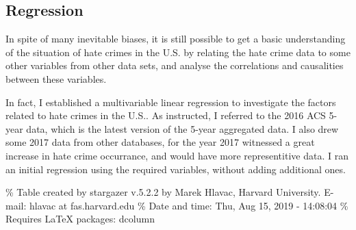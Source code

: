 \documentclass[]{article}
\begin{document}
\hypertarget{regression}{%
\subsection{Regression}\label{regression}}

In spite of many inevitable biases, it is still possible to get a basic
understanding of the situation of hate crimes in the U.S. by relating
the hate crime data to some other variables from other data sets, and
analyse the correlations and causalities between these variables.

In fact, I established a multivariable linear regression to investigate
the factors related to hate crimes in the U.S.. As instructed, I
referred to the 2016 ACS 5-year data, which is the latest version of the
5-year aggregated data. I also drew some 2017 data from other databases,
for the year 2017 witnessed a great increase in hate crime occurrance,
and would have more representitive data. I ran an initial regression
using the required variables, without adding additional ones.

\% Table created by stargazer v.5.2.2 by Marek Hlavac, Harvard
University. E-mail: hlavac at fas.harvard.edu \% Date and time: Thu, Aug
15, 2019 - 14:08:04 \% Requires LaTeX packages: dcolumn
\end{document}
